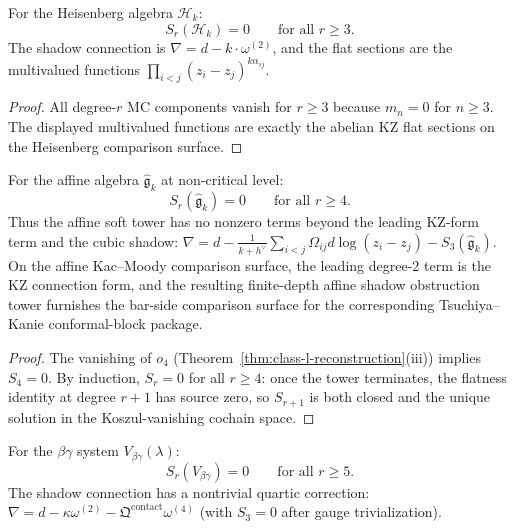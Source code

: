 \begin{proposition}
For the Heisenberg algebra $\mathcal{H}_k$:
\[
S_r(\mathcal{H}_k) = 0 \qquad \text{for all } r \geq 3.
\]
The shadow connection is $\nabla = d - k \cdot \omega^{(2)}$, and the flat sections
are the multivalued functions $\prod_{i < j} (z_i - z_j)^{k \alpha_{ij}}$.
\end{proposition}

\begin{proof}
All degree-$r$ MC components vanish for $r \geq 3$ because $m_n = 0$ for $n \geq 3$.
The displayed multivalued functions are exactly the abelian KZ flat sections on
the Heisenberg comparison surface.
\end{proof}

\begin{proposition}
For the affine algebra $\widehat{\mathfrak{g}}_k$ at non-critical level:
\[
S_r(\widehat{\mathfrak{g}}_k) = 0 \qquad \text{for all } r \geq 4.
\]
Thus the affine soft tower has no nonzero terms beyond the
leading KZ-form term and the cubic shadow:
$\nabla = d - \frac{1}{k+h^\vee}\sum_{i<j} \Omega_{ij} d\log(z_i - z_j)
- S_3(\widehat{\mathfrak{g}}_k)$.
On the affine Kac--Moody comparison surface, the leading degree-$2$
term is the KZ connection form, and the resulting finite-depth affine
shadow obstruction tower furnishes the bar-side comparison surface for the
corresponding Tsuchiya--Kanie conformal-block package.
\end{proposition}

\begin{proof}
The vanishing of $o_4$ (Theorem~\ref{thm:class-l-reconstruction}(iii)) implies
$S_4 = 0$. By induction, $S_r = 0$ for all $r \geq 4$: once the tower terminates,
the flatness identity at degree $r+1$ has source zero, so $S_{r+1}$ is both closed and
the unique solution in the Koszul-vanishing cochain space.
\end{proof}

\begin{proposition}
For the $\beta\gamma$ system $V_{\beta\gamma}(\lambda)$:
\[
S_r(V_{\beta\gamma}) = 0 \qquad \text{for all } r \geq 5.
\]
The shadow connection has a nontrivial quartic correction:
$\nabla = d - \kappa \omega^{(2)} - \mathfrak{Q}^{\mathrm{contact}} \omega^{(4)}$
(with $S_3 = 0$ after gauge trivialization).
\end{proposition}

